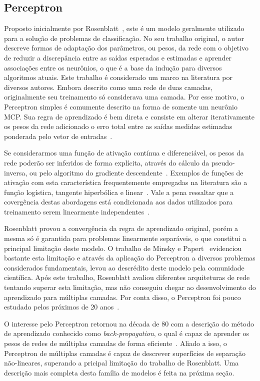 \documentclass[conference]{IEEEtran}
\begin{document}
	\subsection{Perceptron}
	Proposto inicialmente por Rosenblatt~\cite{rosenblatt1957perceptron}, este é um modelo geralmente utilizado para a solução de problemas de classificação. No seu trabalho original, o autor descreve formas de adaptação dos parâmetros, ou pesos, da rede com o objetivo de reduzir a discrepância entre as saídas esperadas e estimadas e aprender associações entre os neurônios, o que é a base da indução para diversos algoritmos atuais. Este trabalho é considerado um marco na literatura por diversos autores. Embora descrito como uma rede de duas camadas, originalmente seu treinamento só considerava uma camada. Por esse motivo, o Perceptron simples é comumente descrito na forma de somente um neurônio MCP. Sua regra de aprendizado é bem direta e consiste em alterar iterativamente os pesos da rede adicionado o erro total entre as saídas medidas estimadas ponderada pelo vetor de entradas~\cite{haykin2007neural}. 
	
	Se considerarmos uma função de ativação contínua e diferenciável, os pesos da rede poderão ser inferidos de forma explícita, através do cálculo da pseudo-inversa, ou pelo algoritmo do gradiente descendente~\cite{hertz1991introduction}. Exemplos de funções de ativação com esta característica frequentemente empregadas na literatura são a função logística, tangente hiperbólica e linear~\cite{jain1996artificial}. Vale a pena ressaltar que a covergência destas abordagens está condicionada aos dados utilizados para treinamento serem linearmente independentes~\cite{hertz1991introduction}.
	
	Rosenblatt provou a convergência da regra de aprendizado original, porém a mesma só é garantida para problemas linearmente separáveis, o que constitui a principal limitação deste modelo. O trabalho de Minsky e Papert~\cite{minsky1969introduction} evidenciou bastante esta limitação e através da aplicação do Perceptron a diversos problemas considerados fundamentais, levou ao descrédito deste modelo pela comunidade científica. Após este trabalho, Rosenblatt avaliou diferentes arquiteturas de rede tentando superar esta limitação, mas não conseguiu chegar ao desenvolvimento do aprendizado para múltiplas camadas. Por conta disso, o Perceptron foi pouco estudado pelos próximos de 20 anos~\cite{hertz1991introduction}.
	
	O interesse pelo Perceptron retornou na década de 80 com a descrição do método de aprendizado conhecido como \textit{back-propagation}, o qual é capaz de aprender os pesos de redes de múltiplas camadas de forma eficiente~\cite{rumelhart1985learning}. Aliado a isso, o Perceptron de múltiplas camadas é capaz de descrever superfícies de separação não-lineares, superando a pricipal limitação do trabalho de Rosenblatt. Uma descrição mais completa desta família de modelos é feita na próxima seção.
\end{document}
